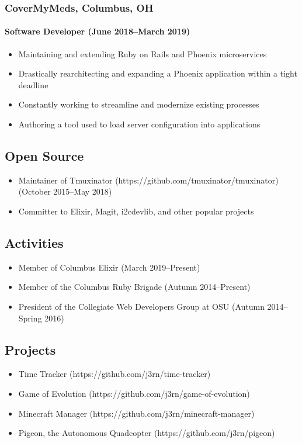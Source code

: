 \documentclass[]{article}
\begin{document}
\subsubsection*{CoverMyMeds, Columbus, OH}
\paragraph*{Software Developer (June 2018--March 2019)}
\begin{itemize}
\item Maintaining and extending Ruby on Rails and Phoenix microservices
\item Drastically rearchitecting and expanding a Phoenix application within a tight deadline
\item Constantly working to streamline and modernize existing processes
\item Authoring a tool used to load server configuration into applications
\end{itemize}

\subsection*{Open Source}
\begin{itemize}
\item Maintainer of Tmuxinator (https://github.com/tmuxinator/tmuxinator) (October 2015--May 2018)
\item Committer to Elixir, Magit, i2cdevlib, and other popular projects
\end{itemize}

\subsection*{Activities}
\begin{itemize}
\item Member of Columbus Elixir (March 2019--Present)
\item Member of the Columbus Ruby Brigade (Autumn 2014--Present)
\item President of the Collegiate Web Developers Group at OSU (Autumn 2014--Spring 2016)
\end{itemize}

\subsection*{Projects}
\begin{itemize}
\item Time Tracker (https://github.com/j3rn/time-tracker)
\item Game of Evolution (https://github.com/j3rn/game-of-evolution)
\item Minecraft Manager (https://github.com/j3rn/minecraft-manager)
\item Pigeon, the Autonomous Quadcopter (https://github.com/j3rn/pigeon)
\end{itemize}
\end{document}
